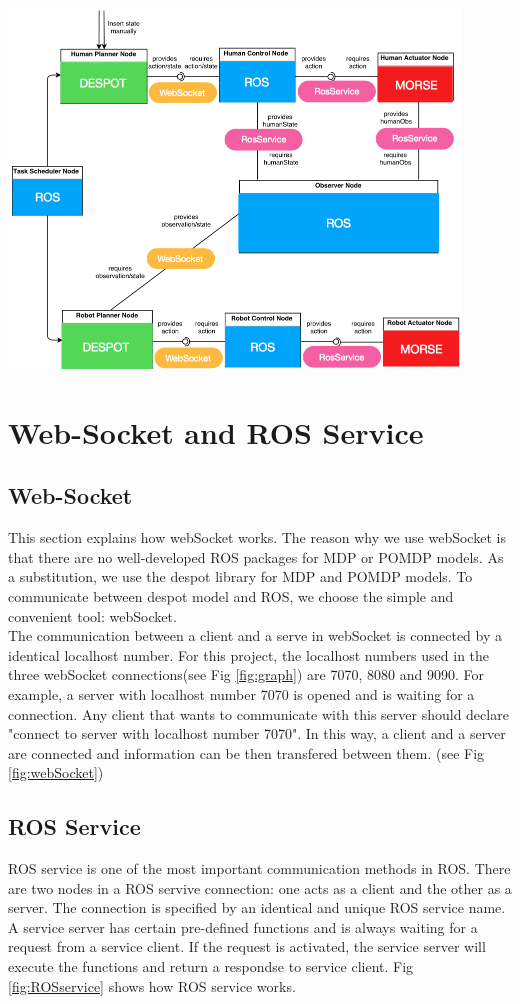 \begin{minipage}{0.8\textwidth}
\centering
	\includegraphics[width=12cm]{Pictures/func/graph.png}
	\label{fig:graph}
\end{minipage}

\section{Web-Socket and ROS Service}
\subsection{Web-Socket}
This section explains how webSocket works. The reason why we use webSocket is that there are no well-developed ROS packages for MDP or POMDP models. As a substitution, we use the despot library for MDP and POMDP models. To communicate between despot model and ROS, we choose the simple and convenient tool: webSocket.\\
The communication between a client and a serve in webSocket is connected by a identical localhost number. For this project, the localhost numbers used in the three webSocket connections(see Fig \ref{fig:graph}) are 7070, 8080 and 9090. For example, a server with localhost number 7070 is opened and is waiting for a connection. Any client that wants to communicate with this server should declare "connect to server with localhost number 7070". In this way, a client and a server are connected and information can be then transfered between them. (see Fig \ref{fig:webSocket})
 
\subsection{ROS Service}
ROS service is one of the most important communication methods in ROS. There are two nodes in a ROS servive connection: one acts as a client and the other as a server. The connection is specified by an identical and unique ROS service name. A service server has certain pre-defined functions and is always waiting for a request from a service client. If the request is activated, the service server will execute the functions and return a respondse to service client. Fig \ref{fig:ROSservice} shows how ROS service works.

